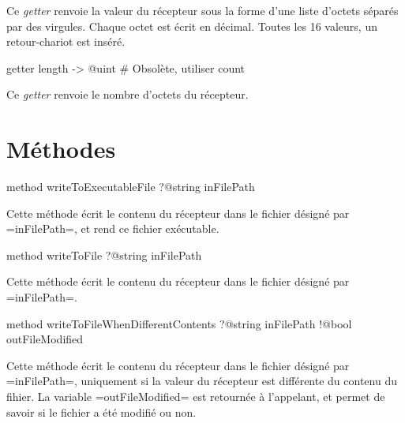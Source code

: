 Ce \emph{getter} renvoie la valeur du récepteur sous la forme d'une liste d'octets séparés par des virgules. Chaque octet est écrit en décimal. Toutes les 16 valeurs, un retour-chariot est inséré.




\begin{galgas}
getter length -> @uint # Obsolète, utiliser count
\end{galgas}

Ce \emph{getter} renvoie le nombre d'octets du récepteur.





\section{Méthodes}



\begin{galgas}
method writeToExecutableFile ?@string inFilePath
\end{galgas}

Cette méthode écrit le contenu du récepteur dans le fichier désigné par \ggs=inFilePath=, et rend ce fichier exécutable.





\begin{galgas}
method writeToFile ?@string inFilePath
\end{galgas}

Cette méthode écrit le contenu du récepteur dans le fichier désigné par \ggs=inFilePath=.





\begin{galgas}
method writeToFileWhenDifferentContents
  ?@string inFilePath
  !@bool outFileModified
\end{galgas}

Cette méthode écrit le contenu du récepteur dans le fichier désigné par \ggs=inFilePath=, uniquement si la valeur du récepteur est différente du contenu du fihier. La variable \ggs=outFileModified= est retournée à l'appelant, et permet de savoir si le fichier a été modifié ou non.







